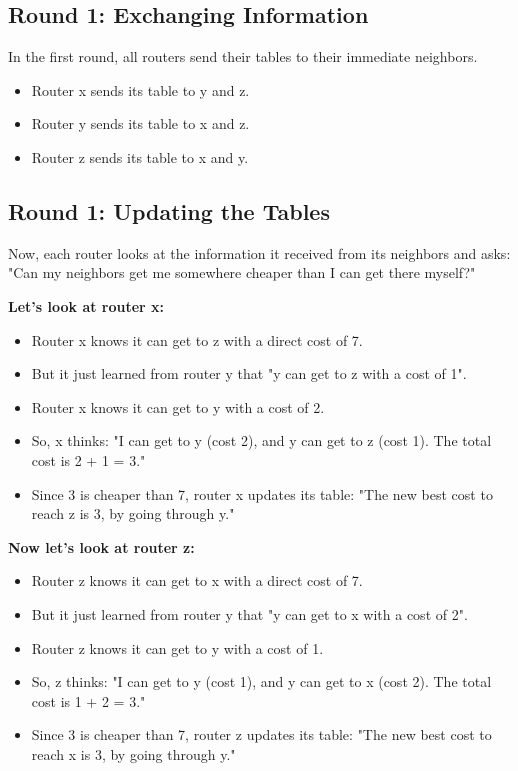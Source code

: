 \documentclass[../../compsys.tex]{subfiles}
\begin{document}
\subsection{Round 1: Exchanging Information}
In the first round, all routers send their tables to their immediate neighbors.
\begin{itemize}
    \item Router x sends its table to y and z.
    \item Router y sends its table to x and z.
    \item Router z sends its table to x and y.
\end{itemize}

\subsection{Round 1: Updating the Tables}
Now, each router looks at the information it received from its neighbors and asks: "Can my neighbors get me somewhere cheaper than I can get there myself?"

\textbf{Let's look at router x:}
\begin{itemize}
    \item Router x knows it can get to z with a direct cost of 7.
    \item But it just learned from router y that "y can get to z with a cost of 1".
    \item Router x knows it can get to y with a cost of 2.
    \item So, x thinks: "I can get to y (cost 2), and y can get to z (cost 1). The total cost is 2 + 1 = 3."
    \item Since 3 is cheaper than 7, router x updates its table: "The new best cost to reach z is 3, by going through y."
\end{itemize}

\textbf{Now let's look at router z:}
\begin{itemize}
    \item Router z knows it can get to x with a direct cost of 7.
    \item But it just learned from router y that "y can get to x with a cost of 2".
    \item Router z knows it can get to y with a cost of 1.
    \item So, z thinks: "I can get to y (cost 1), and y can get to x (cost 2). The total cost is 1 + 2 = 3."
    \item Since 3 is cheaper than 7, router z updates its table: "The new best cost to reach x is 3, by going through y."
\end{itemize}
\end{document}
